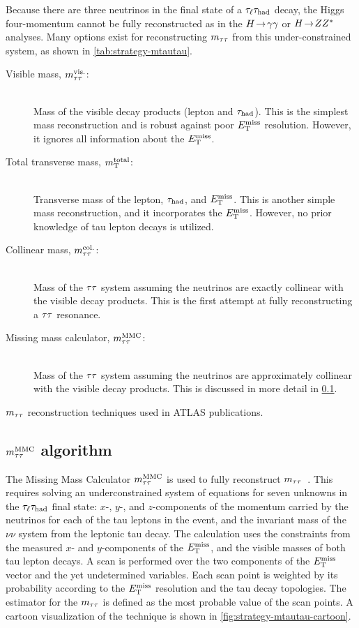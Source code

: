Because there are three neutrinos in the final state of a $\tau_\ell\tau_\text{had}$ decay, the Higgs four-momentum cannot be fully reconstructed as in the $H \!\rightarrow\! \gamma\gamma$ or $H \!\rightarrow\! ZZ^\ast$ analyses. Many options exist for reconstructing $m_{\tau\tau}$ from this under-constrained system, as shown in \cref{tab:strategy-mtautau}.
%
\begin{description}
    \item[Visible mass, $m_{\tau\tau}^\text{vis.}$:] \hfill \\
      Mass of the visible decay products (lepton and $\tau_\text{had}$). This is the simplest mass reconstruction and is robust against poor $E_{\mathrm{T}}^{\mathrm{miss}}$ resolution. However, it ignores all information about the $E_{\mathrm{T}}^{\mathrm{miss}}$.
    \item[Total transverse mass, $m_{\text{T}}^\text{total}$:] \hfill \\
      Transverse mass of the lepton, $\tau_\text{had}$, and $E_{\mathrm{T}}^{\mathrm{miss}}$. This is another simple mass reconstruction, and it incorporates the $E_{\mathrm{T}}^{\mathrm{miss}}$. However, no prior knowledge of tau lepton decays is utilized.
    \item[Collinear mass, $m_{\tau\tau}^\text{col.}$:] \hfill \\
      Mass of the $\tau\tau$ system assuming the neutrinos are exactly collinear with the visible decay products. This is the first attempt at fully reconstructing a $\tau\tau$ resonance.
    \item[Missing mass calculator, $m_{\tau\tau}^\text{MMC}$:] \hfill \\
      Mass of the $\tau\tau$ system assuming the neutrinos are approximately collinear with the visible decay products. This is discussed in more detail in \cref{sec:strategy-mtautau-mMMC}.
\end{description}
%

\begin{table}[bp]
  \centering
  \renewcommand{\arraystretch}{1.4}
  \caption{$m_{\tau\tau}$ reconstruction techniques used in ATLAS publications.}
  
  \label{tab:strategy-mtautau}
\end{table}

\subsection{$m_{\tau\tau}^\text{MMC}$ algorithm}
\label{sec:strategy-mtautau-mMMC}

The Missing Mass Calculator $m_{\tau\tau}^\text{MMC}$ is used to fully reconstruct $m_{\tau\tau}$~\cite{2011.mmc}. This requires solving an underconstrained system of equations for seven unknowns in the $\tau_\ell\tau_\text{had}$ final state: $x$-, $y$-, and $z$-components of the momentum carried by the neutrinos for each of the tau leptons in the event, and the invariant mass of the $\nu\nu$ system from the leptonic tau decay. The calculation uses the constraints from the measured $x$- and $y$-components of the $E_{\mathrm{T}}^{\mathrm{miss}}$, and the visible masses of both tau lepton decays. A scan is performed over the two components of the $E_{\mathrm{T}}^{\mathrm{miss}}$ vector and the yet undetermined variables. Each scan point is weighted by its probability according to the $E_{\mathrm{T}}^{\mathrm{miss}}$ resolution and the tau decay topologies. The estimator for the $m_{\tau\tau}$ is defined as the most probable value of the scan points. A cartoon visualization of the technique is shown in \cref{fig:strategy-mtautau-cartoon}.

